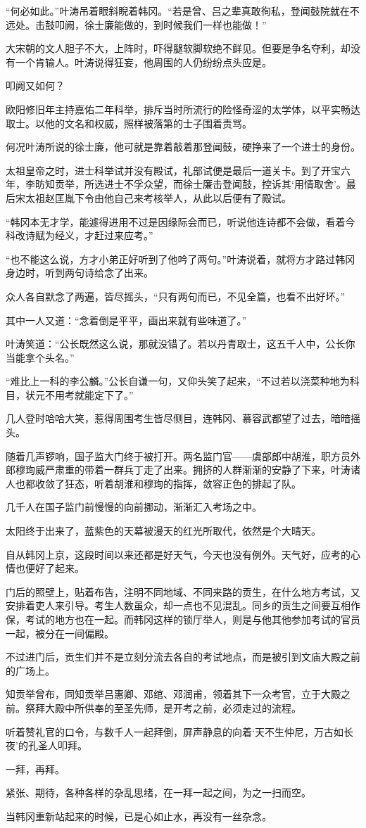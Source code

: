 “何必如此。”叶涛吊着眼斜睨着韩冈。“若是曾、吕之辈真敢徇私，登闻鼓院就在不远处。击鼓叩阙，徐士廉能做的，到时候我们一样也能做！”

大宋朝的文人胆子不大，上阵时，吓得腿软脚软绝不鲜见。但要是争名夺利，却没有一个肯输人。叶涛说得狂妄，他周围的人仍纷纷点头应是。

叩阙又如何？

欧阳修旧年主持嘉佑二年科举，排斥当时所流行的险怪奇涩的太学体，以平实畅达取士。以他的文名和权威，照样被落第的士子围着责骂。

何况叶涛所说的徐士廉，他可就是靠着敲着那登闻鼓，硬挣来了一个进士的身份。

太祖皇帝之时，进士科举试并没有殿试，礼部试便是最后一道关卡。到了开宝六年，李昉知贡举，所选进士不孚众望，而徐士廉击登闻鼓，控诉其‘用情取舍’。最后宋太祖赵匡胤下令由他自己来考核举人，从此以后便有了殿试。

“韩冈本无才学，能遽得进用不过是因缘际会而已，听说他连诗都不会做，看着今科改诗赋为经义，才赶过来应考。”

“也不能这么说，方才小弟正好听到了他吟了两句。”叶涛说着，就将方才路过韩冈身边时，听到两句诗给念了出来。

众人各自默念了两遍，皆尽摇头，“只有两句而已，不见全篇，也看不出好坏。”

其中一人又道：“念着倒是平平，画出来就有些味道了。”

叶涛笑道：“公长既然这么说，那就没错了。若以丹青取士，这五千人中，公长你当能拿个头名。”

“难比上一科的李公麟。”公长自谦一句，又仰头笑了起来，“不过若以浇菜种地为科目，状元不用考就能定下了。”

几人登时哈哈大笑，惹得周围考生皆尽侧目，连韩冈、慕容武都望了过去，暗暗摇头。

随着几声锣响，国子监大门终于被打开。两名监门官——虞部郎中胡淮，职方员外郎穆珣威严肃重的带着一群兵丁走了出来。拥挤的人群渐渐的安静了下来，叶涛诸人也都收敛了狂态，听着胡淮和穆珣的指挥，敛容正色的排起了队。

几千人在国子监门前慢慢的向前挪动，渐渐汇入考场之中。

太阳终于出来了，蓝紫色的天幕被漫天的红光所取代，依然是个大晴天。

自从韩冈上京，这段时间以来还都是好天气，今天也没有例外。天气好，应考的心情也便好了起来。

门后的照壁上，贴着布告，注明不同地域、不同来路的贡生，在什么地方考试，又安排着吏人来引导。考生人数虽众，却一点也不见混乱。同乡的贡生之间要互相作保，考试的地方也在一起。而韩冈这样的锁厅举人，则是与他其他参加考试的官员一起，被分在一间偏殿。

不过进门后，贡生们并不是立刻分流去各自的考试地点，而是被引到文庙大殿之前的广场上。

知贡举曾布，同知贡举吕惠卿、邓绾、邓润甫，领着其下一众考官，立于大殿之前。祭拜大殿中所供奉的至圣先师，是开考之前，必须走过的流程。

听着赞礼官的口令，与数千人一起拜倒，屏声静息的向着‘天不生仲尼，万古如长夜’的孔圣人叩拜。

一拜，再拜。

紧张、期待，各种各样的杂乱思绪，在一拜一起之间，为之一扫而空。

当韩冈重新站起来的时候，已是心如止水，再没有一丝杂念。

